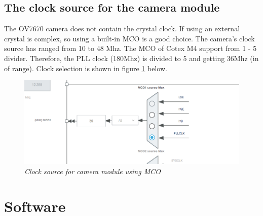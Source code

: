 \documentclass[D:/Latex/Internship/Report/Latex/Report.tex]{subfiles}
\begin{document}
		\subsection{The clock source for the camera module}
		\label{subsec:The clock source for the camera module}
		The OV7670 camera does not contain the crystal clock. If using an external crystal is complex, so using a built-in MCO is a good choice. The camera's clock source has ranged from 10 to 48 Mhz. The MCO of Cotex M4 support from 1 - 5 divider. Therefore, the PLL clock (180Mhz) is divided to 5 and getting 36Mhz (in of range). Clock selection is shown in figure \ref{fig:Clock source for camera} below.\\
			\begin{figure}[ht!]
				\centering
				\includegraphics[scale = 0.5]{Figure/MCO.png}
				\caption{\it Clock source for camera module using MCO}
				\label{fig:Clock source for camera}
			\end{figure}
	\section{Software}
	\label{sec:Software}
\end{document}
